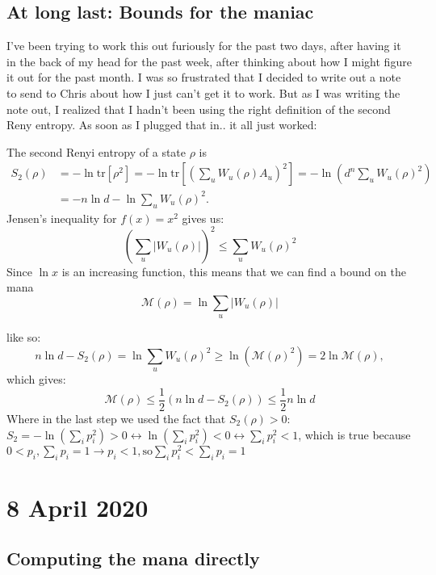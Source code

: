 \documentclass{report}
\begin{document}
\section{At long last: Bounds for the maniac}

I've been trying to work this out furiously for the past two days, after having it in the back of my head for the past week, after thinking about how I might figure it out for the past month. I was so frustrated that I decided to write out a note to send to Chris about how I just can't get it to work. But as I was writing the note out, I realized that I hadn't been using the right definition of the second Reny entropy. As soon as I plugged that in.. it all just worked:

The second Renyi entropy of a state $\rho$ is 
\begin{align}S_2(\rho)&=-\ln\mathrm{tr}[\rho^2]=-\ln\mathrm{tr}\left[\left(\sum_u W_u(\rho)A_u\right)^2\right]=-\ln\left (d^n\sum_uW_u(\rho)^2\right)\\&=-n\ln d-\ln\sum_u W_u(\rho)^2.\end{align}
Jensen's inequality for $f(x)=x^2$ gives us:
\begin{equation} \left(\sum_u|W_u(\rho)|\right)^2\leq \sum_u W_u(\rho)^2\end{equation}
Since $\ln x$ is an increasing function, this means that we can find a bound on the mana 
\begin{equation} \mathcal M(\rho)=\ln \sum_u |W_u(\rho)| \end{equation}

like so:
\begin{equation}n\ln d-S_2(\rho)=\ln\sum_u W_u(\rho)^2\geq \ln\left(\mathcal M(\rho)^2\right)=2\ln \mathcal M(\rho),\end{equation}
which gives:
\begin{equation}\mathcal M(\rho)\leq \frac{1}{2}\left(n\ln d-S_2(\rho)\right)\leq \frac{1}{2}n\ln d\end{equation}
Where in the last step we used the fact that $S_2(\rho)>0$: $S_2=-\ln(\sum_i p_i^2)>0\leftrightarrow \ln(\sum_i p_i^2)<0\leftrightarrow \sum_i p_i^2<1$, which is true because $0<p_i, \sum_i p_i=1\rightarrow p_i<1,\mathrm{ so }\sum_i p_i^2<\sum_i p_i=1$


\chapter{8 April 2020}

\section{Computing the mana directly}
\end{document}
